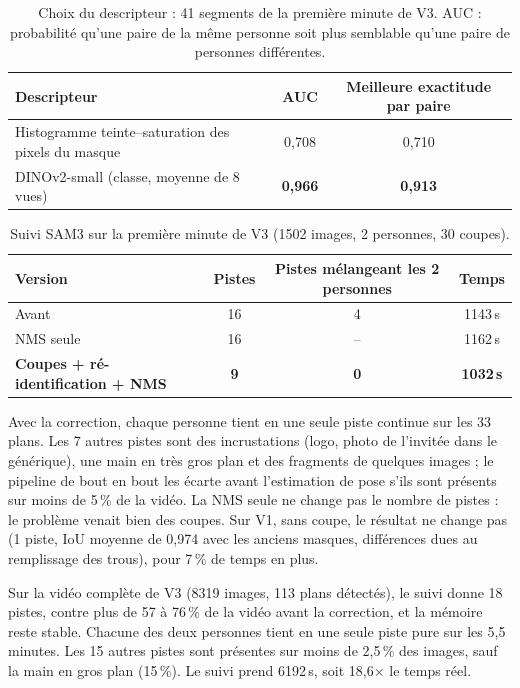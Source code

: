\documentclass[11pt,a4paper]{report}
\begin{document}
\begin{table}[H]
\centering
\caption{Choix du descripteur : 41 segments de la première minute de V3. AUC : probabilité qu'une paire de la même
personne soit plus semblable qu'une paire de personnes différentes.}
\label{tab:reid}
\small
\begin{tabular}{@{}lcc@{}}
\toprule
Descripteur & AUC & Meilleure exactitude par paire \\
\midrule
Histogramme teinte--saturation des pixels du masque & 0,708 & 0,710 \\
DINOv2-small (classe, moyenne de 8 vues) & \textbf{0,966} & \textbf{0,913} \\
\bottomrule
\end{tabular}
\end{table}

\begin{table}[H]
\centering
\caption{Suivi SAM3 sur la première minute de V3 (1502 images, 2 personnes, 30 coupes).}
\label{tab:sam3-plans}
\small
\begin{tabular}{@{}lccc@{}}
\toprule
Version & Pistes & Pistes mélangeant les 2 personnes & Temps \\
\midrule
Avant & 16 & 4 & 1143\,s \\
NMS seule & 16 & -- & 1162\,s \\
\textbf{Coupes + ré-identification + NMS} & \textbf{9} & \textbf{0} & \textbf{1032\,s} \\
\bottomrule
\end{tabular}
\end{table}

Avec la correction, chaque personne tient en une seule piste continue sur les 33 plans. Les 7 autres pistes sont des
incrustations (logo, photo de l'invitée dans le générique), une main en très gros plan et des fragments de quelques
images ; le pipeline de bout en bout les écarte avant l'estimation de pose s'ils sont présents sur moins de 5\,\% de
la vidéo. La NMS seule ne change pas le nombre de pistes : le problème venait bien des coupes. Sur V1, sans coupe,
le résultat ne change pas (1 piste, IoU moyenne de 0,974 avec les anciens masques, différences dues au remplissage
des trous), pour 7\,\% de temps en plus.

Sur la vidéo complète de V3 (8319 images, 113 plans détectés), le suivi donne 18 pistes, contre plus de 57 à 76\,\%
de la vidéo avant la correction, et la mémoire reste stable. Chacune des deux personnes tient en une seule piste
pure sur les 5,5 minutes. Les 15 autres pistes sont présentes sur moins de 2,5\,\% des images, sauf la main en gros
plan (15\,\%). Le suivi prend 6192\,s, soit 18,6$\times$ le temps réel.
\end{document}
